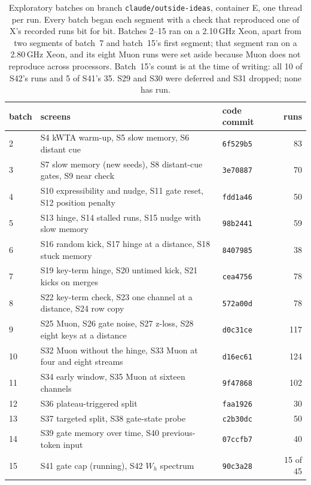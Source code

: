 \documentclass[11pt]{article}
\begin{document}
\begin{table}[H]
\centering
\footnotesize
\begin{tabular}{@{}lllr@{}}
\toprule
batch & screens & code commit & runs\\
\midrule
2 & S4 kWTA warm-up, S5 slow memory, S6 distant cue & \texttt{6f529b5} & 83\\
3 & S7 slow memory (new seeds), S8 distant-cue gates, S9 near check & \texttt{3e70887} & 70\\
4 & S10 expressibility and nudge, S11 gate reset, S12 position penalty & \texttt{fdd1a46} & 50\\
5 & S13 hinge, S14 stalled runs, S15 nudge with slow memory & \texttt{98b2441} & 59\\
6 & S16 random kick, S17 hinge at a distance, S18 stuck memory & \texttt{8407985} & 38\\
7 & S19 key-term hinge, S20 untimed kick, S21 kicks on merges & \texttt{cea4756} & 78\\
8 & S22 key-term check, S23 one channel at a distance, S24 row copy & \texttt{572a00d} & 78\\
9 & S25 Muon, S26 gate noise, S27 z-loss, S28 eight keys at a distance & \texttt{d0c31ce} & 117\\
10 & S32 Muon without the hinge, S33 Muon at four and eight streams & \texttt{d16ec61} & 124\\
11 & S34 early window, S35 Muon at sixteen channels & \texttt{9f47868} & 102\\
12 & S36 plateau-triggered split & \texttt{faa1926} & 30\\
13 & S37 targeted split, S38 gate-state probe & \texttt{c2b30dc} & 50\\
14 & S39 gate memory over time, S40 previous-token input & \texttt{07ccfb7} & 40\\
15 & S41 gate cap (running), S42 $W_h$ spectrum & \texttt{90c3a28} & 15 of 45\\
\bottomrule
\end{tabular}
\caption{Exploratory batches on branch \texttt{claude/outside-ideas}, container E, one thread per run. Every batch began each segment with a check that reproduced one of X's recorded runs bit for bit. Batches 2--15 ran on a 2.10\,GHz Xeon, apart from two segments of batch~7 and batch~15's first segment; that segment ran on a 2.80\,GHz Xeon, and its eight Muon runs were set aside because Muon does not reproduce across processors. Batch~15's count is at the time of writing: all 10 of S42's runs and 5 of S41's 35. S29 and S30 were deferred and S31 dropped; none has run.}
\label{tab:batches}
\end{table}
\end{document}
